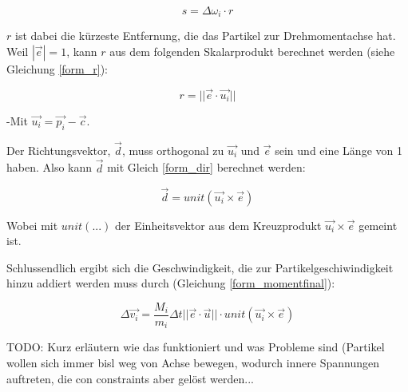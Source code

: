\begin{equation}
s = \Delta \omega_i \cdot r
\label{form_speed}
\end{equation}

$r$ ist dabei die kürzeste Entfernung, die das Partikel zur Drehmomentachse hat.
Weil $|\vec{e}|=1$, kann $r$ aus dem folgenden Skalarprodukt berechnet werden (siehe Gleichung \ref{form_r}):

\begin{equation}
r = ||\vec{e} \cdot \vec{u_i}||
\label{form_r}
\end{equation}

-Mit $\vec{u_i}=\vec{p_i}-\vec{c}$. 

Der Richtungsvektor, $\vec{d}$, muss orthogonal zu $\vec{u_i}$ und $\vec{e}$ sein und eine Länge von 1 haben. Also kann $\vec{d}$ mit Gleich \ref{form_dir} berechnet werden:

\begin{equation}
\vec{d} = unit(\vec{u_i} \times \vec{e} )
\label{form_dir}
\end{equation}

Wobei mit $unit(...)$ der Einheitsvektor aus dem Kreuzprodukt $\vec{u_i} \times \vec{e} $ gemeint ist.

Schlussendlich ergibt sich die Geschwindigkeit, die zur Partikelgeschiwindigkeit hinzu addiert werden muss durch (Gleichung \ref{form_momentfinal}):

\begin{equation}
\Delta \vec{v_i} =  \dfrac{M_i}{m_i} \Delta t ||\vec{e} \cdot \vec{u}|| \cdot unit(\vec{u_i} \times \vec{e} )
\label{form_momentfinal}
\end{equation}

TODO: Kurz erläutern wie das funktioniert und was Probleme sind (Partikel wollen sich immer bisl weg von Achse bewegen, wodurch innere Spannungen auftreten, die con constraints aber gelöst werden...


